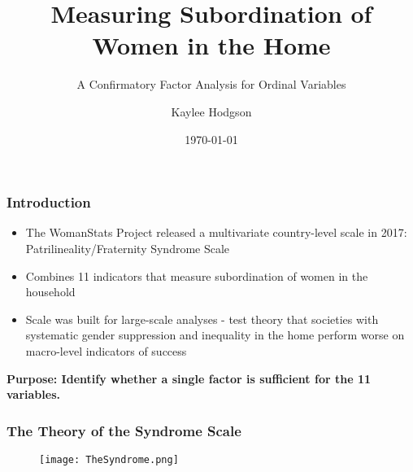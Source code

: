 \documentclass{beamer}
\title{Measuring Subordination of Women in the Home}
\subtitle{A Confirmatory Factor Analysis for Ordinal Variables}
\author{Kaylee Hodgson}
\institute{Brigham Young University}
\date{\today}
\begin{document}
\begin{frame}
\titlepage
\end{frame}

\begin{frame}
\frametitle{Introduction}
\begin{itemize}
\item The WomanStats Project released a multivariate country-level scale in 2017: Patrilineality/Fraternity Syndrome Scale
\item Combines 11 indicators that measure subordination of women in the household
\item Scale was built for large-scale analyses - test theory that societies with systematic gender suppression and inequality in the home perform worse on macro-level indicators of success
\end{itemize}
\bf{Purpose: Identify whether a single factor is sufficient for the 11 variables.}
\end{frame}

\begin{frame}
\frametitle{The Theory of the Syndrome Scale}
\begin{figure}
\texttt{[image: TheSyndrome.png]}
\end{figure}
\end{frame}
\end{document}

